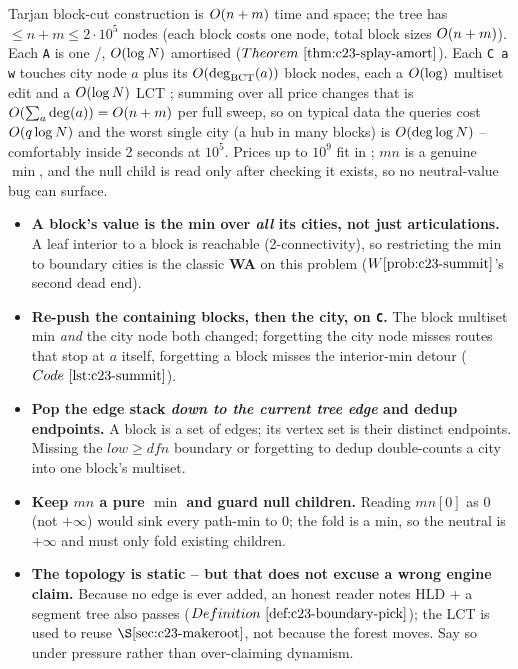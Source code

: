\begin{complexitybox}
Tarjan block-cut construction is \(O(n+m)\) time and space; the tree has
\(\le n+m\le 2\cdot10^5\) nodes (each block costs one node, total block sizes \(O(n+m)\)). Each
\texttt{A} is one /, \(O(\log N)\) amortised (\(\thmref{c23-splay-amort}\)).
Each \texttt{C a w} touches city node \(a\) plus its \(O(\deg_{\text{BCT}}(a))\) block nodes, each a
\(O(\log)\) multiset edit and a \(O(\log N)\) LCT ; summing over all price changes
that is \(O(\sum_a \deg(a))=O(n+m)\) per full sweep, so on typical data the queries cost
\(O(q\log N)\) and the worst single city (a hub in many blocks) is \(O(\deg\log N)\) --
comfortably inside 2 seconds at \(10^5\). Prices up to \(10^9\) fit in ;
\(\mathit{mn}\) is a genuine \(\min\), and the null child is read only after checking it exists, so no
neutral-value bug can surface.
\end{complexitybox}

\begin{hardeningbox}
\begin{itemize}[nosep,leftmargin=1.4em]
  \item \textbf{A block's value is the min over \emph{all} its cities, not just articulations.} A
        leaf interior to a block is reachable (2-connectivity), so restricting the min to boundary
        cities is the classic \textbf{WA} on this problem (\(\probref{c23-summit}\)'s second dead end).
  \item \textbf{Re-push the containing blocks, then the city, on \texttt{C}.} The block multiset min
        \emph{and} the city node both changed; forgetting the city node misses routes that stop at
        \(a\) itself, forgetting a block misses the interior-min detour (\(\coderef{c23-summit}\)).
  \item \textbf{Pop the edge stack \emph{down to the current tree edge} and dedup endpoints.} A block
        is a set of edges; its vertex set is their distinct endpoints. Missing the \(\mathit{low}\ge
        \mathit{dfn}\) boundary or forgetting to dedup double-counts a city into one block's multiset.
  \item \textbf{Keep \(\mathit{mn}\) a pure \(\min\) and guard null children.} Reading
        \(\mathit{mn}[0]\) as \(0\) (not \(+\infty\)) would sink every path-min to \(0\); the fold is
        a min, so the neutral is \(+\infty\) and  must only fold existing children.
  \item \textbf{The topology is static -- but that does not excuse a wrong engine claim.} Because no
        edge is ever added, an honest reader notes HLD + a segment tree also passes
        (\(\defref{c23-boundary-pick}\)); the LCT is used to reuse \(\secref{c23-makeroot}\), not
        because the forest moves. Say so under pressure rather than over-claiming dynamism.
\end{itemize}
\end{hardeningbox}

